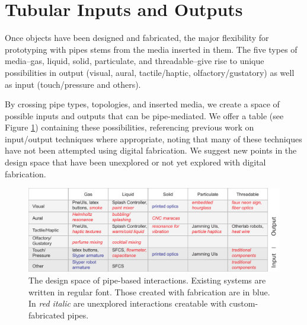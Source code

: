 \section{Tubular Inputs and Outputs}


Once objects have been designed and fabricated, the major flexibility for prototyping with pipes stems from the media inserted in them.  The five types of media--gas, liquid, solid, particulate, and threadable--give rise to unique possibilities in output (visual, aural, tactile/haptic, olfactory/gustatory) as well as input (touch/pressure and others).


By crossing pipe types, topologies, and inserted media, we create a space of possible inputs and outputs that can be pipe-mediated.  We offer a table (see Figure \ref{fig:designspace}) containing these possibilities, referencing previous work on input/output techniques where appropriate, noting that many of these techniques have not been attempted using digital fabrication.  We suggest new points in the design space that have been unexplored or not yet explored with digital fabrication.

\begin{figure}[t]
\centering
    \includegraphics[width=\textwidth]{figures/designspace.pdf}
\caption{The design space of pipe-based interactions.  Existing systems are written in regular font.  Those created with fabrication are in {\color{blue}blue}. In \emph{{\color{red}red italic}} are unexplored interactions creatable with custom-fabricated pipes.  }
\label{fig:designspace}
\end{figure}


